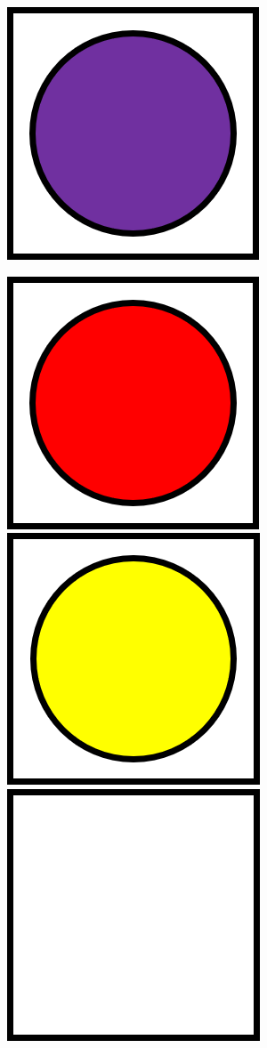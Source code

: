 \documentclass[12pt,a4paper,openright]{book}
\theoremstyle{break}
\begin{document}
\begin{center}
\includegraphics[scale=0.65]{purpleCube.png}
\end{center}

\begin{center}
\includegraphics[scale=0.65]{redCube.png}
\includegraphics[scale=0.65]{yellowCube.png}
\includegraphics[scale=0.65]{emptyCell.png}


\end{center}
\end{document}
